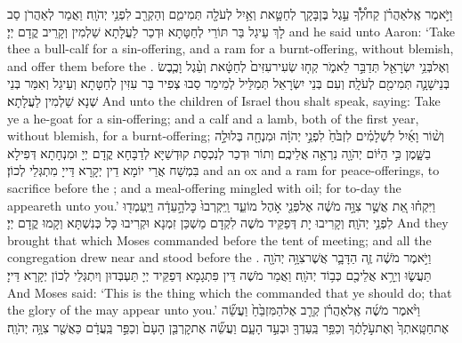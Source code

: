 {וַיֹּ֣אמֶר אֶֽל\maqqaf אַהֲרֹ֗ן קַח\maqqaf לְ֠ךָ֠ עֵ֣גֶל בֶּן\maqqaf בָּקָ֧ר לְחַטָּ֛את וְאַ֥יִל לְעֹלָ֖ה תְּמִימִ֑ם וְהַקְרֵ֖ב לִפְנֵ֥י יְהֹוָֽה׃}
{וַאֲמַר לְאַהֲרֹן סַב לָךְ עֵיגַל בַּר תּוֹרֵי לְחַטָּתָא וּדְכַר לַעֲלָתָא שַׁלְמִין וְקָרֵיב קֳדָם יְיָ׃}
{and he said unto Aaron: ‘Take thee a bull-calf for a sin-offering, and a ram for a burnt-offering, without blemish, and offer them before the \lord.}{}
{וְאֶל\maqqaf בְּנֵ֥י יִשְׂרָאֵ֖ל תְּדַבֵּ֣ר לֵאמֹ֑ר קְח֤וּ שְׂעִיר\maqqaf עִזִּים֙ לְחַטָּ֔את וְעֵ֨גֶל וָכֶ֧בֶשׂ בְּנֵי\maqqaf שָׁנָ֛ה תְּמִימִ֖ם לְעֹלָֽה׃}
{וְעִם בְּנֵי יִשְׂרָאֵל תְּמַלֵּיל לְמֵימַר סַבוּ צְפִיר בַּר עִזִּין לְחַטָּתָא וְעֵיגַל וְאִמַּר בְּנֵי שְׁנָא שַׁלְמִין לַעֲלָתָא׃}
{And unto the children of Israel thou shalt speak, saying: Take ye a he-goat for a sin-offering; and a calf and a lamb, both of the first year, without blemish, for a burnt-offering;}{}
{וְשׁ֨וֹר וָאַ֜יִל לִשְׁלָמִ֗ים לִזְבֹּ֙חַ֙ לִפְנֵ֣י יְהֹוָ֔ה וּמִנְחָ֖ה בְּלוּלָ֣ה בַשָּׁ֑מֶן כִּ֣י הַיּ֔וֹם יְהֹוָ֖ה נִרְאָ֥ה אֲלֵיכֶֽם׃}
{וְתוֹר וּדְכַר לְנִכְסַת קוּדְשַׁיָּא לְדַבָּחָא קֳדָם יְיָ וּמִנְחָתָא דְּפִילָא בִּמְשַׁח אֲרֵי יוֹמָא דֵין יְקָרָא דַּייָ מִתְגְּלֵי לְכוֹן׃}
{and an ox and a ram for peace-offerings, to sacrifice before the \lord; and a meal-offering mingled with oil; for to-day the \lord\space appeareth unto you.’}{}
{וַיִּקְח֗וּ אֵ֚ת אֲשֶׁ֣ר צִוָּ֣ה מֹשֶׁ֔ה אֶל\maqqaf פְּנֵ֖י אֹ֣הֶל מוֹעֵ֑ד וַֽיִּקְרְבוּ֙ כׇּל\maqqaf הָ֣עֵדָ֔ה וַיַּֽעַמְד֖וּ לִפְנֵ֥י יְהֹוָֽה׃}
{וְקָרִיבוּ יָת דְּפַקֵּיד מֹשֶׁה לִקְדָם מַשְׁכַּן זִמְנָא וּקְרִיבוּ כָּל כְּנִשְׁתָּא וְקָמוּ קֳדָם יְיָ׃}
{And they brought that which Moses commanded before the tent of meeting; and all the congregation drew near and stood before the \lord.}{}
{וַיֹּ֣אמֶר מֹשֶׁ֔ה זֶ֧ה הַדָּבָ֛ר אֲשֶׁר\maqqaf צִוָּ֥ה יְהֹוָ֖ה תַּעֲשׂ֑וּ וְיֵרָ֥א אֲלֵיכֶ֖ם כְּב֥וֹד יְהֹוָֽה׃}
{וַאֲמַר מֹשֶׁה דֵּין פִּתְגָמָא דְּפַקֵּיד יְיָ תַּעְבְּדוּן וְיִתְגְּלֵי לְכוֹן יְקָרָא דַּייָ׃}
{And Moses said: ‘This is the thing which the \lord\space commanded that ye should do; that the glory of the \lord\space may appear unto you.’}{}
{וַיֹּ֨אמֶר מֹשֶׁ֜ה אֶֽל\maqqaf אַהֲרֹ֗ן קְרַ֤ב אֶל\maqqaf הַמִּזְבֵּ֙חַ֙ וַעֲשֵׂ֞ה אֶת\maqqaf חַטָּֽאתְךָ֙ וְאֶת\maqqaf עֹ֣לָתֶ֔ךָ וְכַפֵּ֥ר בַּֽעַדְךָ֖ וּבְעַ֣ד הָעָ֑ם וַעֲשֵׂ֞ה אֶת\maqqaf קׇרְבַּ֤ן הָעָם֙ וְכַפֵּ֣ר בַּֽעֲדָ֔ם כַּאֲשֶׁ֖ר צִוָּ֥ה יְהֹוָֽה׃}

